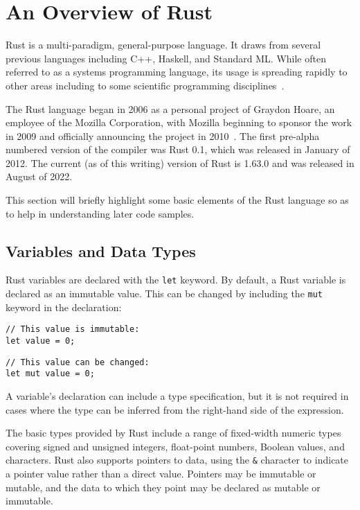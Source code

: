 \section{An Overview of Rust}
\label{sec:rust}

Rust is a multi-paradigm, general-purpose language. It draws from several previous languages including C++, Haskell, and Standard ML. While often referred to as a systems programming language, its usage is spreading rapidly to other areas including to some scientific programming disciplines~\cite{nature.rust.2020}.

The Rust language began in 2006 as a personal project of Graydon Hoare, an employee of the Mozilla Corporation, with Mozilla beginning to sponsor the work in 2009 and officially announcing the project in 2010~\cite{asay.2021}. The first pre-alpha numbered version of the compiler was Rust 0.1, which was released in January of 2012. The current (as of this writing) version of Rust is 1.63.0 and was released in August of 2022.

This section will briefly highlight some basic elements of the Rust language so as to help in understanding later code samples.

\subsection{Variables and Data Types}

Rust variables are declared with the \texttt{let} keyword. By default, a Rust variable is declared as an immutable value. This can be changed by including the \texttt{mut} keyword in the declaration:

\begin{lstlisting}
// This value is immutable:
let value = 0;
\end{lstlisting}
\begin{lstlisting}
// This value can be changed:
let mut value = 0;
\end{lstlisting}

A variable's declaration can include a type specification, but it is not required in cases where the type can be inferred from the right-hand side of the expression.

The basic types provided by Rust include a range of fixed-width numeric types covering signed and unsigned integers, float-point numbers, Boolean values, and characters. Rust also supports pointers to data, using the \texttt{\&} character to indicate a pointer value rather than a direct value. Pointers may be immutable or mutable, and the data to which they point may be declared as mutable or immutable.

